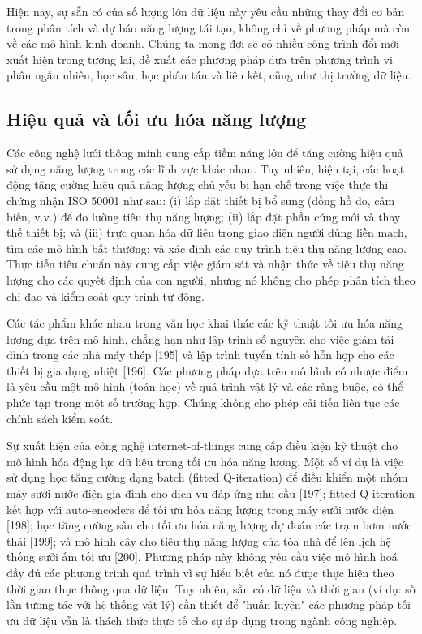 \documentclass[utf8]{frontiersSCNS} %
\begin{document}
Hiện nay, sự sẵn có của số lượng lớn dữ liệu này yêu cầu những thay đổi cơ bản trong phân tích và dự báo năng lượng tái tạo, không chỉ về phương pháp mà còn về các mô hình kinh doanh. Chúng ta mong đợi sẽ có nhiều công trình đổi mới xuất hiện trong tương lai, đề xuất các phương pháp dựa trên phương trình vi phân ngẫu nhiên, học sâu, học phân tán và liên kết, cũng như thị trường dữ liệu.


\subsection{Hiệu quả và tối ưu hóa năng lượng}
Các công nghệ lưới thông minh cung cấp tiềm năng lớn để tăng cường hiệu quả sử dụng năng lượng trong các lĩnh vực khác nhau. Tuy nhiên, hiện tại, các hoạt động tăng cường hiệu quả năng lượng chủ yếu bị hạn chế trong việc thực thi chứng nhận ISO 50001 như sau: (i) lắp đặt thiết bị bổ sung (đồng hồ đo, cảm biến, v.v.) để đo lường tiêu thụ năng lượng; (ii) lắp đặt phần cứng mới và thay thế thiết bị; và (iii) trực quan hóa dữ liệu trong giao diện người dùng liền mạch, tìm các mô hình bất thường; và xác định các quy trình tiêu thụ năng lượng cao. Thực tiễn tiêu chuẩn này cung cấp việc giám sát và nhận thức về tiêu thụ năng lượng cho các quyết định của con người, nhưng nó không cho phép phân tích theo chỉ đạo và kiểm soát quy trình tự động.

Các tác phẩm khác nhau trong văn học khai thác các kỹ thuật tối ưu hóa năng lượng dựa trên mô hình, chẳng hạn như lập trình số nguyên cho việc giảm tải đỉnh trong các nhà máy thép [195] và lập trình tuyến tính số hỗn hợp cho các thiết bị gia dụng nhiệt [196]. Các phương pháp dựa trên mô hình có nhược điểm là yêu cầu một mô hình (toán học) về quá trình vật lý và các ràng buộc, có thể phức tạp trong một số trường hợp. Chúng không cho phép cải tiến liên tục các chính sách kiểm soát.

Sự xuất hiện của công nghệ internet-of-things cung cấp điều kiện kỹ thuật cho mô hình hóa động lực dữ liệu trong tối ưu hóa năng lượng. Một số ví dụ là việc sử dụng học tăng cường dạng batch (fitted Q-iteration) để điều khiển một nhóm máy sưởi nước điện gia đình cho dịch vụ đáp ứng nhu cầu [197]; fitted Q-iteration kết hợp với auto-encoders để tối ưu hóa năng lượng trong máy sưởi nước điện [198]; học tăng cường sâu cho tối ưu hóa năng lượng dự đoán các trạm bơm nước thải [199]; và mô hình cây cho tiêu thụ năng lượng của tòa nhà để lên lịch hệ thống sưởi ấm tối ưu [200]. Phương pháp này không yêu cầu việc mô hình hoá đầy đủ các phương trình quá trình vì sự hiểu biết của nó được thực hiện theo thời gian thực thông qua dữ liệu. Tuy nhiên, sẵn có dữ liệu và thời gian (ví dụ: số lần tương tác với hệ thống vật lý) cần thiết để "huấn luyện" các phương pháp tối ưu dữ liệu vẫn là thách thức thực tế cho sự áp dụng trong ngành công nghiệp.
\end{document}
